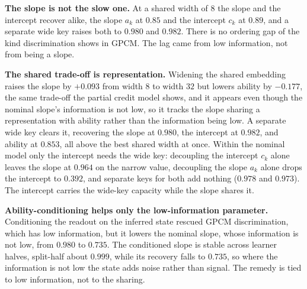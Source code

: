 \documentclass[twocolumn,10pt]{article}
\begin{document}
\textbf{The slope is not the slow one.} At a shared width of $8$ the slope and the intercept
recover alike, the slope $a_k$ at $0.85$ and the intercept $c_k$ at $0.89$, and a separate
wide key raises both to $0.980$ and $0.982$. There is no ordering gap of the kind
discrimination shows in GPCM. The lag came from low information, not from being a slope.

\textbf{The shared trade-off is representation.} Widening the shared embedding raises the
slope by $+0.093$ from width $8$ to width $32$ but lowers ability by $-0.177$, the same
trade-off the partial credit model shows, and it appears even though the nominal slope's
information is not low, so it tracks the slope sharing a representation with ability rather
than the information being low. A separate wide key clears it, recovering the slope at
$0.980$, the intercept at $0.982$, and ability at $0.853$, all above the best shared width at
once. Within the nominal model only the intercept needs the wide key: decoupling the
intercept $c_k$ alone leaves the slope at $0.964$ on the narrow value, decoupling the slope
$a_k$ alone drops the intercept to $0.392$, and separate keys for both add nothing
($0.978$ and $0.973$). The intercept carries the wide-key capacity while the slope shares it.

\textbf{Ability-conditioning helps only the low-information parameter.} Conditioning the
readout on the inferred state rescued GPCM discrimination, which has low information, but it
lowers the nominal slope, whose information is not low, from $0.980$ to $0.735$. The
conditioned slope is stable across learner halves, split-half about $0.999$, while its
recovery falls to $0.735$, so where the information is not low the state adds noise rather
than signal. The remedy is tied to low information, not to the sharing.
\end{document}
